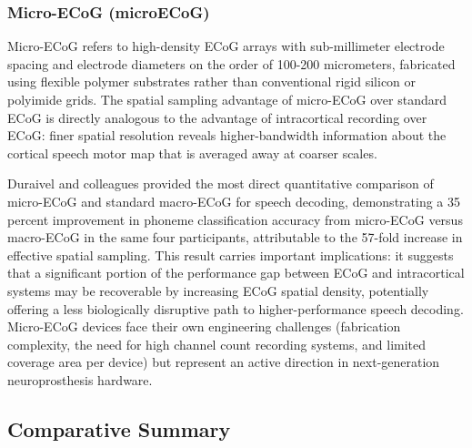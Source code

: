 \subsubsection{Micro-ECoG (microECoG)}

Micro-ECoG refers to high-density ECoG arrays with sub-millimeter electrode spacing and electrode diameters on the order of 100-200 micrometers, fabricated using flexible polymer substrates rather than conventional rigid silicon or polyimide grids. The spatial sampling advantage of micro-ECoG over standard ECoG is directly analogous to the advantage of intracortical recording over ECoG: finer spatial resolution reveals higher-bandwidth information about the cortical speech motor map that is averaged away at coarser scales.

Duraivel and colleagues \cite{Duraivel2023} provided the most direct quantitative comparison of micro-ECoG and standard macro-ECoG for speech decoding, demonstrating a 35 percent improvement in phoneme classification accuracy from micro-ECoG versus macro-ECoG in the same four participants, attributable to the 57-fold increase in effective spatial sampling. This result carries important implications: it suggests that a significant portion of the performance gap between ECoG and intracortical systems may be recoverable by increasing ECoG spatial density, potentially offering a less biologically disruptive path to higher-performance speech decoding. Micro-ECoG devices face their own engineering challenges (fabrication complexity, the need for high channel count recording systems, and limited coverage area per device) but represent an active direction in next-generation neuroprosthesis hardware.

\subsection{Comparative Summary}

